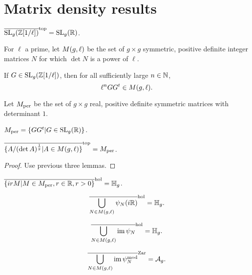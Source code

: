 \documentclass{amsart}
\begin{document}
\section{Matrix density results}
\label{sec:matr-dens-results}

\begin{lemma}
  $\overline{\operatorname{SL}_g(\mathbb{Z}[1/\ell])}^\mathrm{top} = \operatorname{SL}_g(\mathbb{R})$.
\end{lemma}

\begin{definition}
  For $\ell$ a prime, let $M(g,\ell)$ be the set of $g \times g$ symmetric, positive definite integer matrices $N$ for which $\det N$ is a power of $\ell$.
\end{definition}

\begin{lemma}
  If $G \in \operatorname{SL}_g(\mathbb{Z}[1/\ell])$, then for all sufficiently large $n \in \mathbb{N}$,
  \[
    \ell^n GG^t \in M(g,\ell).
  \]
\end{lemma}

\begin{definition}
  Let $M_{\textrm{per}}$ be the set of $g \times g$ real, positive definite symmetric matrices  with determinant $1$.
\end{definition}

\begin{lemma}
  $M_{\textrm{per}} = \{GG^t | G \in \operatorname{SL}_g(\mathbb{R})\}$.
\end{lemma}

\begin{proposition}
  $\overline{\{A/(\det A)^{\frac{1}{g}} | A \in M(g,\ell)\}}^\mathrm{top} = M_{\textrm{per}}$.
\end{proposition}

\begin{proof}
  Use previous three lemmas.
\end{proof}

\begin{lemma}
  $\overline{\{ irM | M \in M_{\textrm{per}}, r \in \mathbb{R}, r > 0\}}^\mathrm{hol} = \mathbb{H}_g$.
\end{lemma}

\begin{lemma}
  \[
    \overline{\bigcup_{N \in M(g,\ell)} \psi_N(i\mathbb{R})}^\mathrm{hol} = \mathbb{H}_g.
  \]
\end{lemma}

\begin{lemma}
  \[
    \overline{\bigcup_{N \in M(g,\ell)} \operatorname{im} \psi_N}^\mathrm{hol} = \mathbb{H}_g.
  \]
\end{lemma}

\begin{proposition}
  \[
    \overline{\bigcup_{N \in M(g,\ell)} \operatorname{im} \psi_N^{\textrm{mod}}}^\mathrm{Zar} = \mathcal{A}_g.
  \]
\end{proposition}
\end{document}
